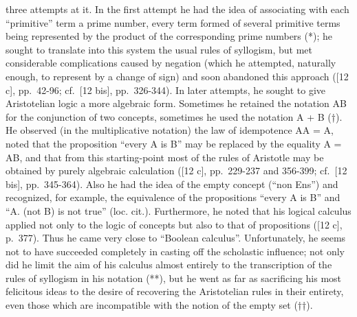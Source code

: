 three attempts at it. In the first attempt he had the idea of associating with each ``primitive'' term a prime number, every term formed of several primitive terms being represented by the product of the corresponding prime numbers (*); he sought to translate into this system the usual rules of syllogism, but met considerable complications caused by negation (which he attempted, naturally enough, to represent by a change of sign) and soon abandoned this approach ({[}12 c{]}, pp.~42-96; cf.~{[}12 bis{]}, pp.~326-344). In later attempts, he sought to give Aristotelian logic a more algebraic form. Sometimes he retained the notation AB for the conjunction of two concepts, sometimes he used the notation A + B (†). He observed (in the multiplicative notation) the law of idempotence AA = A, noted that the proposition ``every A is B'' may be replaced by the equality A = AB, and that from this starting-point most of the rules of Aristotle may be obtained by purely algebraic calculation ({[}12 c{]}, pp.~229-237 and 356-399; cf.~{[}12 bis{]}, pp.~345-364). Also he had the idea of the empty concept (``non Ens'') and recognized, for example, the equivalence of the propositions ``every A is B'' and ``A. (not B) is not true'' (loc. cit.). Furthermore, he noted that his logical calculus applied not only to the logic of concepts but also to that of propositions ({[}12 c{]}, p.~377). Thus he came very close to ``Boolean calculus''. Unfortunately, he seems not to have succeeded completely in casting off the scholastic influence; not only did he limit the aim of his calculus almost entirely to the transcription of the rules of syllogism in his notation (**), but he went as far as sacrificing his most felicitous ideas to the desire of recovering the Aristotelian rules in their entirety, even those which are incompatible with the notion of the empty set (††).

